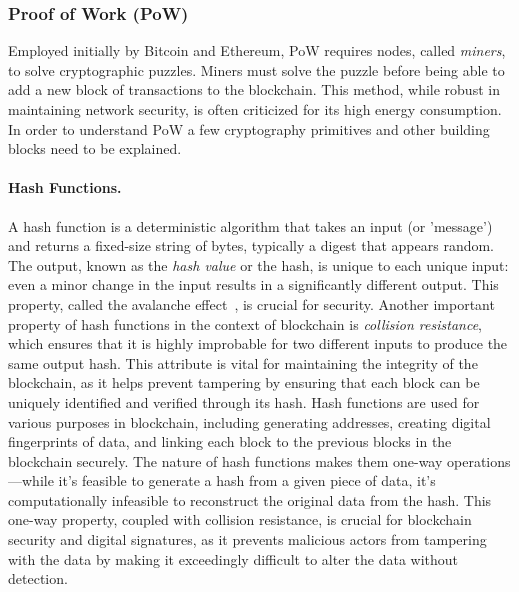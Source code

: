 \subsubsection{Proof of Work (PoW)} \label{pow}

Employed initially by Bitcoin and Ethereum, PoW requires nodes, called \textit{miners}, to solve cryptographic puzzles. Miners must solve the puzzle before being able to add a new block of transactions to the blockchain. This method, while robust in maintaining network security, is often criticized for its high energy consumption. In order to understand PoW a few cryptography primitives and other building blocks need to be explained.


\paragraph{Hash Functions.}
A hash function is a deterministic algorithm that takes an input (or 'message') and returns a fixed-size string of bytes, typically a digest that appears random. The output, known as the \textit{hash value} or the hash, is unique to each unique input: even a minor change in the input results in a significantly different output. This property, called the avalanche effect~\cite{feistel1973cryptography}, is crucial for security. Another important property of hash functions in the context of blockchain is \textit{collision resistance}, which ensures that it is highly improbable for two different inputs to produce the same output hash. This attribute is vital for maintaining the integrity of the blockchain, as it helps prevent tampering by ensuring that each block can be uniquely identified and verified through its hash. Hash functions are used for various purposes in blockchain, including generating addresses, creating digital fingerprints of data, and linking each block to the previous blocks in the blockchain securely. The nature of hash functions makes them one-way operations---while it's feasible to generate a hash from a given piece of data, it's computationally infeasible to reconstruct the original data from the hash. This one-way property, coupled with collision resistance, is crucial for blockchain security and digital signatures, as it prevents malicious actors from tampering with the data by making it exceedingly difficult to alter the data without detection.


